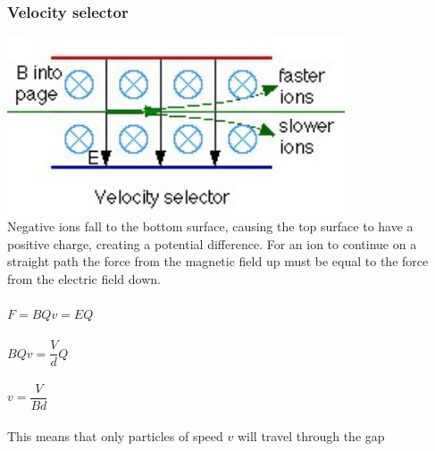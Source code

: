 \documentclass{article}[18pt]
\begin{document}
\subsubsection{Velocity selector}
\includegraphics[width=10cm]{velocity_selector.jpg}\\
Negative ions fall to the bottom surface, causing the top surface to have a positive charge, creating a potential difference. For an ion to continue on a straight path the force from the magnetic field up must be equal to the force from the electric field down.\\
\\
$F=BQv=EQ$\\
\\
$BQv=\dfrac{V}{d}Q$\\
\\
$v=\dfrac{V}{Bd}$\\
\\
This means that only particles of speed $v$ will travel through the gap
\end{document}
